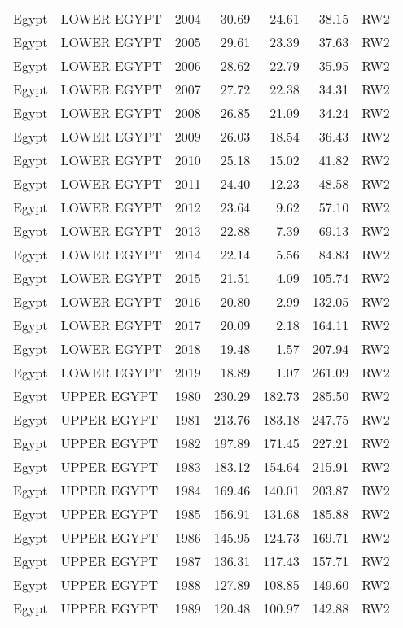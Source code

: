 \begin{longtable}{lllrrrl}
  Egypt & LOWER EGYPT & 2004 & 30.69 & 24.61 & 38.15 & RW2 \\ 
  Egypt & LOWER EGYPT & 2005 & 29.61 & 23.39 & 37.63 & RW2 \\ 
  Egypt & LOWER EGYPT & 2006 & 28.62 & 22.79 & 35.95 & RW2 \\ 
  Egypt & LOWER EGYPT & 2007 & 27.72 & 22.38 & 34.31 & RW2 \\ 
  Egypt & LOWER EGYPT & 2008 & 26.85 & 21.09 & 34.24 & RW2 \\ 
  Egypt & LOWER EGYPT & 2009 & 26.03 & 18.54 & 36.43 & RW2 \\ 
  Egypt & LOWER EGYPT & 2010 & 25.18 & 15.02 & 41.82 & RW2 \\ 
  Egypt & LOWER EGYPT & 2011 & 24.40 & 12.23 & 48.58 & RW2 \\ 
  Egypt & LOWER EGYPT & 2012 & 23.64 & 9.62 & 57.10 & RW2 \\ 
  Egypt & LOWER EGYPT & 2013 & 22.88 & 7.39 & 69.13 & RW2 \\ 
  Egypt & LOWER EGYPT & 2014 & 22.14 & 5.56 & 84.83 & RW2 \\ 
  Egypt & LOWER EGYPT & 2015 & 21.51 & 4.09 & 105.74 & RW2 \\ 
  Egypt & LOWER EGYPT & 2016 & 20.80 & 2.99 & 132.05 & RW2 \\ 
  Egypt & LOWER EGYPT & 2017 & 20.09 & 2.18 & 164.11 & RW2 \\ 
  Egypt & LOWER EGYPT & 2018 & 19.48 & 1.57 & 207.94 & RW2 \\ 
  Egypt & LOWER EGYPT & 2019 & 18.89 & 1.07 & 261.09 & RW2 \\ 
  Egypt & UPPER EGYPT & 1980 & 230.29 & 182.73 & 285.50 & RW2 \\ 
  Egypt & UPPER EGYPT & 1981 & 213.76 & 183.18 & 247.75 & RW2 \\ 
  Egypt & UPPER EGYPT & 1982 & 197.89 & 171.45 & 227.21 & RW2 \\ 
  Egypt & UPPER EGYPT & 1983 & 183.12 & 154.64 & 215.91 & RW2 \\ 
  Egypt & UPPER EGYPT & 1984 & 169.46 & 140.01 & 203.87 & RW2 \\ 
  Egypt & UPPER EGYPT & 1985 & 156.91 & 131.68 & 185.88 & RW2 \\ 
  Egypt & UPPER EGYPT & 1986 & 145.95 & 124.73 & 169.71 & RW2 \\ 
  Egypt & UPPER EGYPT & 1987 & 136.31 & 117.43 & 157.71 & RW2 \\ 
  Egypt & UPPER EGYPT & 1988 & 127.89 & 108.85 & 149.60 & RW2 \\ 
  Egypt & UPPER EGYPT & 1989 & 120.48 & 100.97 & 142.88 & RW2 \\ 

\end{longtable}
